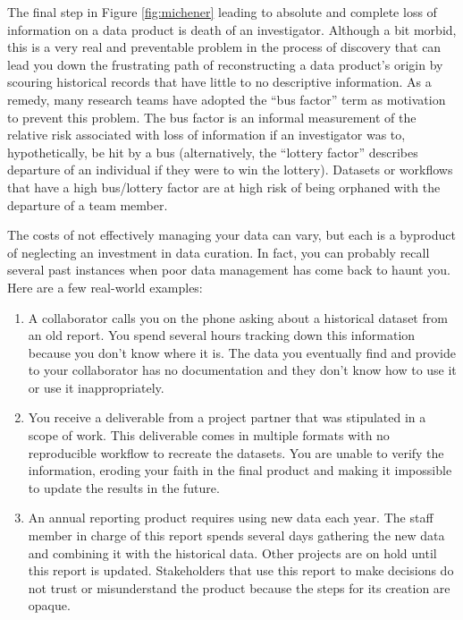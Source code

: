 \documentclass[
]{book}
\providecommand{\tightlist}{%
  \setlength{\itemsep}{0pt}\setlength{\parskip}{0pt}}
\begin{document}
The final step in Figure \ref{fig:michener} leading to absolute and complete loss of information on a data product is death of an investigator. Although a bit morbid, this is a very real and preventable problem in the process of discovery that can lead you down the frustrating path of reconstructing a data product's origin by scouring historical records that have little to no descriptive information. As a remedy, many research teams have adopted the ``bus factor'' term as motivation to prevent this problem. The bus factor is an informal measurement of the relative risk associated with loss of information if an investigator was to, hypothetically, be hit by a bus (alternatively, the ``lottery factor'' describes departure of an individual if they were to win the lottery). Datasets or workflows that have a high bus/lottery factor are at high risk of being orphaned with the departure of a team member.

The costs of not effectively managing your data can vary, but each is a byproduct of neglecting an investment in data curation. In fact, you can probably recall several past instances when poor data management has come back to haunt you. Here are a few real-world examples:

\begin{enumerate}
\def\labelenumi{\arabic{enumi})}
\tightlist
\item
  A collaborator calls you on the phone asking about a historical dataset from an old report. You spend several hours tracking down this information because you don't know where it is. The data you eventually find and provide to your collaborator has no documentation and they don't know how to use it or use it inappropriately.
\item
  You receive a deliverable from a project partner that was stipulated in a scope of work. This deliverable comes in multiple formats with no reproducible workflow to recreate the datasets. You are unable to verify the information, eroding your faith in the final product and making it impossible to update the results in the future.
\item
  An annual reporting product requires using new data each year. The staff member in charge of this report spends several days gathering the new data and combining it with the historical data. Other projects are on hold until this report is updated. Stakeholders that use this report to make decisions do not trust or misunderstand the product because the steps for its creation are opaque.
\end{enumerate}
\end{document}
